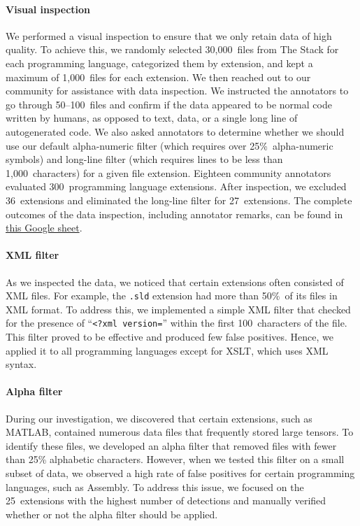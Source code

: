 \paragraph{Visual inspection} We performed a visual inspection to ensure that we only retain data of high quality. To achieve this, we randomly selected 30,000~files from The Stack for each programming language, categorized them by extension, and kept a maximum of 1,000~files for each extension. We then reached out to our community for assistance with data inspection. We instructed the annotators to go through 50--100~files and confirm if the data appeared to be normal code written by humans, as opposed to text, data, or a single long line of autogenerated code. We also asked annotators to determine whether we should use our default alpha-numeric filter (which requires over 25\%~alpha-numeric symbols) and long-line filter (which requires lines to be less than 1,000~characters) for a given file extension. Eighteen community annotators evaluated 300~programming language extensions. After inspection, we excluded 36~extensions and eliminated the long-line filter for 27~extensions. The complete outcomes of the data inspection, including annotator remarks, can be found in  \href{https://docs.google.com/spreadsheets/d/1Lk-pTk_rXI__fCgixr7ZWSi8wR09Zzd2j_G90J80r00/edit?usp=sharing}{this Google sheet}. 

\paragraph{XML filter} As we inspected the data, we noticed that certain extensions often consisted of XML files. For example, the \texttt{.sld} extension had more than 50\%~of its files in XML format. To address this, we implemented a simple XML filter that checked for the presence of ``\texttt{<?xml version=}'' within the first 100~characters of the file. This filter proved to be effective and produced few false positives. Hence, we applied it to all programming languages except for XSLT, which uses XML syntax.

\paragraph{Alpha filter} During our investigation, we discovered that certain extensions, such as MATLAB, contained numerous data files that frequently stored large tensors. To identify these files, we developed an alpha filter that removed files with fewer than 25\% alphabetic characters. However, when we tested this filter on a small subset of data, we observed a high rate of false positives for certain programming languages, such as Assembly. To address this issue, we focused on the 25~extensions with the highest number of detections and manually verified whether or not the alpha filter should be applied.

